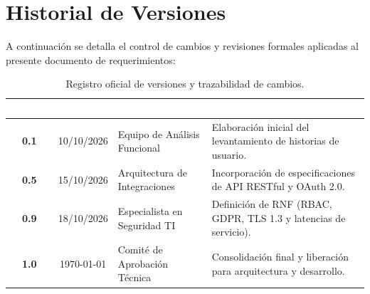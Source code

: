 \section{Historial de Versiones}

A continuación se detalla el control de cambios y revisiones formales aplicadas al presente documento de requerimientos:

\vspace{0.3cm}
\begin{table}[h]
    \centering
    \sffamily\small
    \renewcommand{\arraystretch}{1.3}
    \begin{tabularx}{\textwidth}{c c p{4.2cm} X}
        \toprule
        \rowcolor{PrimaryNavy}
        \textcolor{white}{\textbf{Versión}} & 
        \textcolor{white}{\textbf{Fecha}} & 
        \textcolor{white}{\textbf{Autor}} & 
        \textcolor{white}{\textbf{Descripción del Cambio}} \\
        \midrule
        \rowcolor{BgSoftGray}
        \textbf{0.1} & 10/10/2026 & Equipo de Análisis Funcional & Elaboración inicial del levantamiento de historias de usuario. \\
        \textbf{0.5} & 15/10/2026 & Arquitectura de Integraciones & Incorporación de especificaciones de API RESTful y OAuth 2.0. \\
        \rowcolor{BgSoftGray}
        \textbf{0.9} & 18/10/2026 & Especialista en Seguridad TI & Definición de RNF (RBAC, GDPR, TLS 1.3 y latencias de servicio). \\
        \textbf{1.0} & \today & Comité de Aprobación Técnica & Consolidación final y liberación para arquitectura y desarrollo. \\
        \bottomrule
    \end{tabularx}
    \caption{Registro oficial de versiones y trazabilidad de cambios.}
    \label{tab:historial_versiones}
\end{table}

\vspace{0.6cm}
